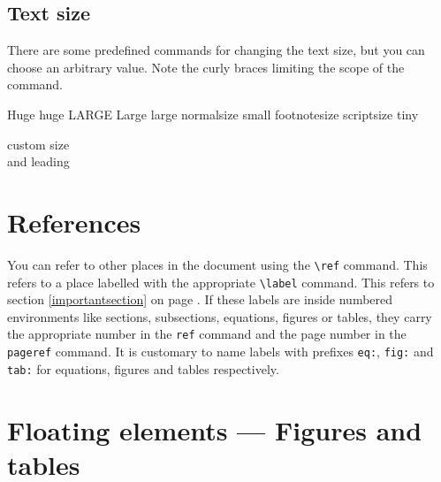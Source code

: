 \documentclass[11pt]{article}
\begin{document}
\subsection{Text size}
There are some predefined commands for changing the text size, but you can choose an arbitrary value. Note the curly braces limiting the scope of the command.

{\Huge Huge}
{\huge huge}
{\LARGE LARGE}
{\Large Large}
{\large large}
{\normalsize normalsize}
{\small small}
{\footnotesize footnotesize}
{\scriptsize scriptsize}
{\tiny tiny}

{\fontsize{1.2cm}{1.7cm}\selectfont custom size\\ and leading\par}


\section{References}
You can refer to other places in the document using the \texttt{\textbackslash ref} command. This refers to a place labelled with the appropriate \texttt{\textbackslash label} command. This refers to section \ref{importantsection} on page \pageref{importantsection}. If these labels are inside numbered environments like sections, subsections, equations, figures or tables, they carry the appropriate number in the \texttt{ref} command and the page number in the \texttt{pageref} command. It is customary to name labels with prefixes \texttt{eq:}, \texttt{fig:} and \texttt{tab:} for equations, figures and tables respectively.

\section{Floating elements --- Figures and tables}
\end{document}
